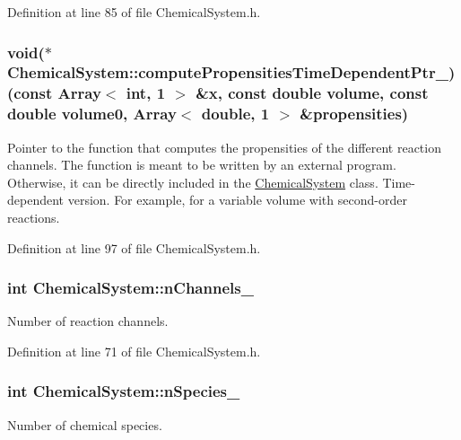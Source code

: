 \-Definition at line 85 of file \-Chemical\-System.\-h.

\hypertarget{class_chemical_system_a3d13c124984ab85b686c6d15f3a1c610}{
\subsubsection[{compute\-Propensities\-Time\-Dependent\-Ptr\-\_\-}]{\setlength{\rightskip}{0pt plus 5cm}void($\ast$ {\bf \-Chemical\-System\-::compute\-Propensities\-Time\-Dependent\-Ptr\-\_\-})(const \-Array$<$ int, 1 $>$ \&x, const double volume, const double volume0, \-Array$<$ double, 1 $>$ \&propensities)}}\label{class_chemical_system_a3d13c124984ab85b686c6d15f3a1c610}
\-Pointer to the function that computes the propensities of the different reaction channels. \-The function is meant to be written by an external program. \-Otherwise, it can be directly included in the \hyperlink{class_chemical_system}{\-Chemical\-System} class. \-Time-\/dependent version. \-For example, for a variable volume with second-\/order reactions. 

\-Definition at line 97 of file \-Chemical\-System.\-h.

\hypertarget{class_chemical_system_a3fc8beba6ac2e8ae92b5dfa30b1742c1}{
\subsubsection[{n\-Channels\-\_\-}]{\setlength{\rightskip}{0pt plus 5cm}int {\bf \-Chemical\-System\-::n\-Channels\-\_\-}}}\label{class_chemical_system_a3fc8beba6ac2e8ae92b5dfa30b1742c1}
\-Number of reaction channels. 

\-Definition at line 71 of file \-Chemical\-System.\-h.

\hypertarget{class_chemical_system_afcd6d3452b7a6badf31d85a54eab1168}{
\subsubsection[{n\-Species\-\_\-}]{\setlength{\rightskip}{0pt plus 5cm}int {\bf \-Chemical\-System\-::n\-Species\-\_\-}}}\label{class_chemical_system_afcd6d3452b7a6badf31d85a54eab1168}
\-Number of chemical species. 

